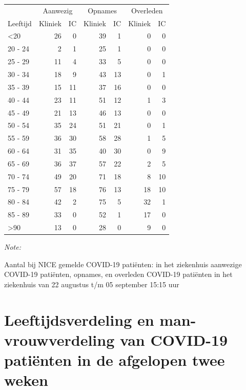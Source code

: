 \documentclass[
  english,
  man,floatsintext]{apa6}
\begin{document}
\begin{table}
\centering\begingroup\fontsize{10}{12}\selectfont

\begin{threeparttable}
\begin{tabular}{lrrrrrr}
\toprule
\multicolumn{1}{c}{ } & \multicolumn{2}{c}{Aanwezig} & \multicolumn{2}{c}{Opnames} & \multicolumn{2}{c}{Overleden} \\
\cmidrule(l{3pt}r{3pt}){2-3} \cmidrule(l{3pt}r{3pt}){4-5} \cmidrule(l{3pt}r{3pt}){6-7}
Leeftijd & Kliniek & IC & Kliniek & IC & Kliniek & IC\\
\midrule
<20 & 26 & 0 & 39 & 1 & 0 & 0\\
20 - 24 & 2 & 1 & 25 & 1 & 0 & 0\\
25 - 29 & 11 & 4 & 33 & 5 & 0 & 0\\
30 - 34 & 18 & 9 & 43 & 13 & 0 & 1\\
35 - 39 & 15 & 11 & 37 & 16 & 0 & 0\\
40 - 44 & 23 & 11 & 51 & 12 & 1 & 3\\
45 - 49 & 21 & 13 & 46 & 13 & 0 & 0\\
50 - 54 & 35 & 24 & 51 & 21 & 0 & 1\\
55 - 59 & 36 & 30 & 58 & 28 & 1 & 5\\
60 - 64 & 31 & 35 & 40 & 30 & 0 & 9\\
65 - 69 & 36 & 37 & 57 & 22 & 2 & 5\\
70 - 74 & 49 & 20 & 71 & 18 & 8 & 10\\
75 - 79 & 57 & 18 & 76 & 13 & 18 & 10\\
80 - 84 & 42 & 2 & 75 & 5 & 32 & 1\\
85 - 89 & 33 & 0 & 52 & 1 & 17 & 0\\
>90 & 13 & 0 & 28 & 0 & 9 & 0\\
\bottomrule
\end{tabular}
\begin{tablenotes}
\item \textit{Note: } 
\item Aantal bij NICE gemelde COVID-19 patiënten: in het ziekenhuis aanwezige COVID-19 patiënten, opnames, en overleden COVID-19 patiënten in het ziekenhuis van 22 augustus t/m 05 september 15:15 uur
\end{tablenotes}
\end{threeparttable}
\endgroup{}
\end{table}

\newpage

\hypertarget{leeftijdsverdeling-en-man-vrouwverdeling-van-covid-19-patiuxebnten-in-de-afgelopen-twee-weken}{%
\section{Leeftijdsverdeling en man-vrouwverdeling van COVID-19 patiënten in de afgelopen twee weken}\label{leeftijdsverdeling-en-man-vrouwverdeling-van-covid-19-patiuxebnten-in-de-afgelopen-twee-weken}}
\end{document}

